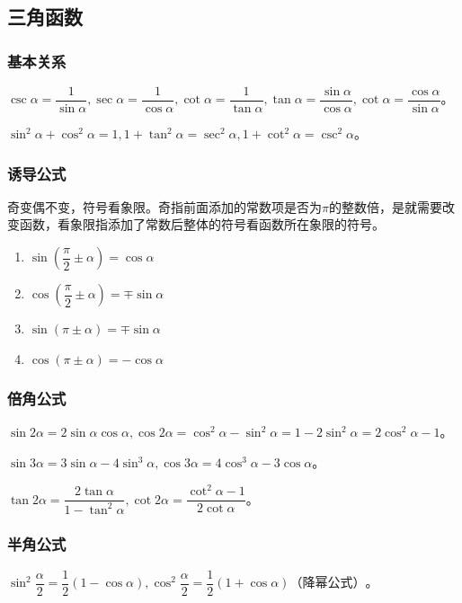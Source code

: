 \documentclass[UTF8, 12pt]{ctexart}
\begin{document}
\subsection{三角函数}

\subsubsection{基本关系}

$\csc\alpha=\dfrac{1}{\sin\alpha},\sec\alpha=\dfrac{1}{\cos\alpha},\cot\alpha=\dfrac{1}{\tan\alpha},\tan\alpha=\dfrac{\sin\alpha}{\cos\alpha},\cot\alpha=\dfrac{\cos\alpha}{\sin\alpha}$。

$\sin^2\alpha+\cos^2\alpha=1,1+\tan^2\alpha=\sec^2\alpha,1+\cot^2\alpha=\csc^2\alpha$。

\subsubsection{诱导公式}

奇变偶不变，符号看象限。奇指前面添加的常数项是否为$\pi$的整数倍，是就需要改变函数，看象限指添加了常数后整体的符号看函数所在象限的符号。

\begin{enumerate}
    \item $\sin(\dfrac{\pi}{2}\pm\alpha)=\cos\alpha$
    \item $\cos(\dfrac{\pi}{2}\pm\alpha)=\mp\sin\alpha$
    \item $\sin(\pi\pm\alpha)=\mp\sin\alpha$
    \item $\cos(\pi\pm\alpha)=-\cos\alpha$
\end{enumerate}

\subsubsection{倍角公式}

$\sin 2\alpha=2\sin\alpha\cos\alpha,\cos 2\alpha=\cos^2\alpha-\sin^2\alpha=1-2\sin^2\alpha=2\cos^2\alpha-1$。

$\sin 3\alpha=3\sin\alpha - 4\sin^3\alpha,\cos 3\alpha=4\cos^3\alpha-3\cos\alpha$。

$\tan 2\alpha=\dfrac{2\tan\alpha}{1-\tan^2\alpha},\cot 2\alpha=\dfrac{\cot^2\alpha-1}{2\cot\alpha}$。

\subsubsection{半角公式}

$\sin^2\dfrac{\alpha}{2}=\dfrac{1}{2}(1-\cos\alpha),\cos^2\dfrac{\alpha}{2}=\dfrac{1}{2}(1+\cos\alpha)\text{（降幂公式）}$。
\end{document}
